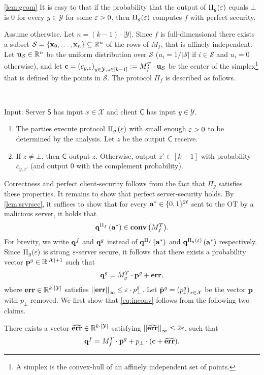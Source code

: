 \documentclass{llncs}
\renewcommand{\S}{\mathcal{S}}
\newcommand{\X}{\mathcal{X}}
\newcommand{\Y}{\mathcal{Y}}
\newcommand{\CH}[1]{\normalfont{\mathbf{conv}\of{#1}}}
\newcommand{\p}{\myvec{p}}
\renewcommand{\q}{\myvec{q}}
\renewcommand{\a}{\myvec{a}}
\renewcommand{\c}{\myvec{c}}
\newcommand{\x}{\myvec{x}}
\newcommand{\errvec}{\myvec{err}}
\newcommand{\norm}[2]{\left|\left|#1\right|\right|_{#2}}
\renewcommand{\Sc}{\mathsf{S}}
\newcommand{\Cc}{\mathsf{C}}
\begin{document}
\begin{proofof}{\cref{lem:geom}}
It is easy to that if the probability that the output of $\Pi_g(\varepsilon)$ equals $\bot$ is 0 for every $y\in\Y$ for some $\varepsilon>0$, then $\Pi_g(\varepsilon)$ computes $f$ with perfect security.

Assume otherwise. Let $n=(k-1)\cdot|\Y|$. Since $f$ is full-dimensional there exists a subset $\S=\set{\x_0,\ldots,\x_{n}}\su\R^{n}$ of the rows of $M_f$, that is affinely independent. Let $\myvec{u}_\S\in\R^{n}$ be the uniform distribution over $\S$ (\ie $u_i=1/|\S|$ if $i\in\S$ and $u_i=0$ otherwise), and let $\c=\vect{c_{y,z}}_{y\in\Y,z\in[k-1]}:=M^T_f\cdot\myvec{u}_{\S}$ be the center of the simplex\footnote{A simplex is the convex-hull of an affinely independent set of points.} that is defined by the points in $\S$. The protocol $\Pi_f$ is described as follows. 

\begin{protocol}[$\Pi_f$]~

Input: Server $\Sc$ has input $x\in\X$ and client $\Cc$ has input $y\in\Y$.

\begin{enumerate}
	\item The parties execute protocol $\Pi_g\left ( \varepsilon \right )$ with small enough $\varepsilon>0$ to be determined by the analysis. Let $z$ be the output $\Cc$ receive.

	\item If $z\ne\bot$, then $\Cc$ output $z$. Otherwise, output $z'\in[k-1]$ with probability $c_{y,z'}$ (and output 0 with the complement probability).
\end{enumerate}
\end{protocol}

Correctness and perfect client-security follows from the fact that $\Pi_g$ satisfies these properties. It remains to show that perfect server-security holds. By \cref{lem:srvrsec}, it suffices to show that for every $\a^*\in\zo^{2\ell}$ sent to the OT by a malicious server, it holds that
\begin{align}\label{eq:inconv}
\q^{\Pi_f}\of{\a^*}\in\CH{M_f^T}.
\end{align}
For brevity, we write $\q^f$ and $\q^g$ instead of $\q^{\Pi_f}\of{\a^*}$ and $\q^{\Pi_g(\eps)}\of{\a^*}$ respectively. Since $\Pi_g(\varepsilon)$ is strong $\varepsilon$-server secure, it follows that there exists a probability vector $\p^g\in\R^{|\X|+1}$ such that
$$\q^{g}=M_g^T\cdot\p^g+\errvec,$$
where $\errvec\in\R^{k\cdot|\Y|}$ satisfies $\norm{\errvec}{\infty}\leq\eps\cdot p^g_\bot$. Let $\bar{\p}^g=\vect{p_x^g}_{x\in\X}$ be the vector $\p$ with $p_\bot$ removed. We first show that \cref{eq:inconv} follows from the following two claims.
\begin{claim}\label{clm:first}
There exists a vector $\widehat{\errvec}\in\R^{k\cdot|\Y|}$ satisfying $\norm{\widehat{\errvec}}{\infty}\leq 2\eps$, such that 
$$\q^f=M_f^T\cdot\bar{\p}^g+p_\bot\cdot(\c+\widehat{\errvec}).$$
\end{claim}


\end{proofof}
\end{document}
